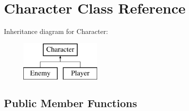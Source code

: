 \hypertarget{class_character}{}\section{Character Class Reference}
\label{class_character}
Inheritance diagram for Character\+:\begin{figure}[H]
\begin{center}
\leavevmode
\includegraphics[height=2.000000cm]{class_character}
\end{center}
\end{figure}
\subsection*{Public Member Functions}
